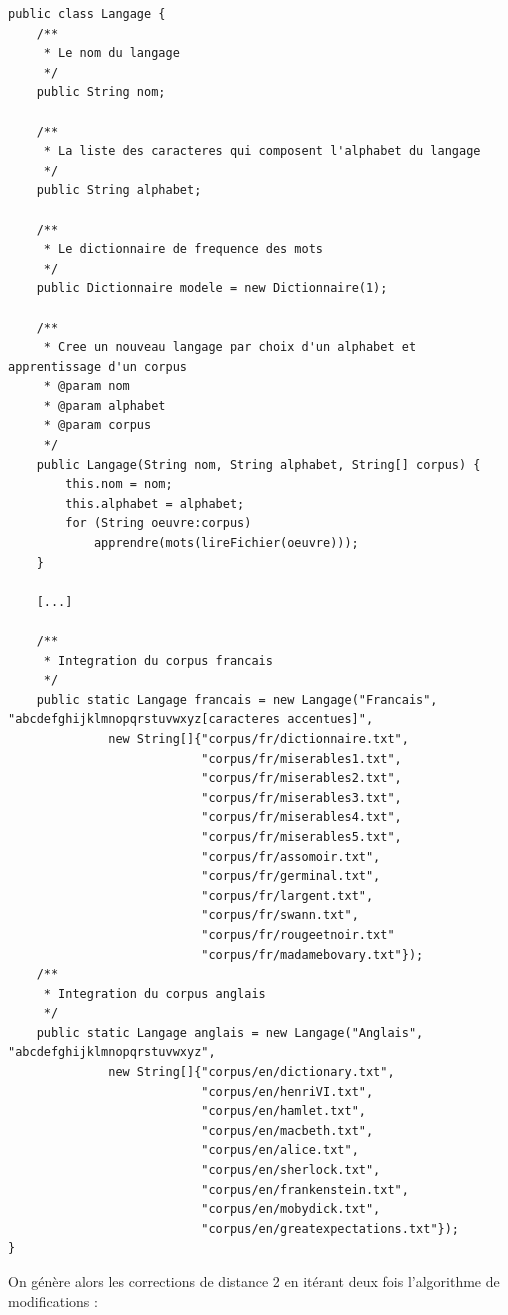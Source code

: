 \documentclass[10pt,a4paper]{article}
\begin{document}
\begin{lstlisting}
public class Langage {
    /**
     * Le nom du langage
     */
    public String nom;
    
    /**
     * La liste des caracteres qui composent l'alphabet du langage
     */
    public String alphabet;
    
    /**
     * Le dictionnaire de frequence des mots
     */
    public Dictionnaire modele = new Dictionnaire(1);
    
    /**
     * Cree un nouveau langage par choix d'un alphabet et apprentissage d'un corpus
     * @param nom
     * @param alphabet
     * @param corpus
     */
    public Langage(String nom, String alphabet, String[] corpus) {
        this.nom = nom;
        this.alphabet = alphabet;
        for (String oeuvre:corpus)
            apprendre(mots(lireFichier(oeuvre)));
    }
    
    [...]
    
    /**
     * Integration du corpus francais
     */
    public static Langage francais = new Langage("Francais", "abcdefghijklmnopqrstuvwxyz[caracteres accentues]", 
              new String[]{"corpus/fr/dictionnaire.txt",
                           "corpus/fr/miserables1.txt", 
                           "corpus/fr/miserables2.txt", 
                           "corpus/fr/miserables3.txt", 
                           "corpus/fr/miserables4.txt",
                           "corpus/fr/miserables5.txt",
                           "corpus/fr/assomoir.txt",
                           "corpus/fr/germinal.txt",
                           "corpus/fr/largent.txt",
                           "corpus/fr/swann.txt",
                           "corpus/fr/rougeetnoir.txt"
                           "corpus/fr/madamebovary.txt"});
    /**
     * Integration du corpus anglais
     */
    public static Langage anglais = new Langage("Anglais", "abcdefghijklmnopqrstuvwxyz", 
              new String[]{"corpus/en/dictionary.txt",
                           "corpus/en/henriVI.txt",
                           "corpus/en/hamlet.txt",
                           "corpus/en/macbeth.txt",
                           "corpus/en/alice.txt",
                           "corpus/en/sherlock.txt",
                           "corpus/en/frankenstein.txt",
                           "corpus/en/mobydick.txt",
                           "corpus/en/greatexpectations.txt"});
}
\end{lstlisting}

On génère alors les corrections de distance 2 en itérant deux fois l'algorithme de modifications : 
\end{document}
